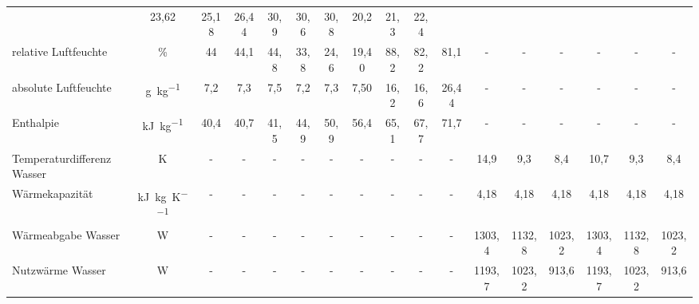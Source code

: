\begin{landscape}
\begin{table}[h!]
{\begin{tabular}{l|c|c|c|c|c|c|c|c|c|c|c|c|c|c|c|c}
					&23,62 & 25,18 & 26,44 
					&\multicolumn{1}{c|}{30,9} & \multicolumn{1}{c|}{30,6} & \multicolumn{1}{c|}{30,8} 
					&\multicolumn{1}{c|}{20,2} & \multicolumn{1}{c|}{21,3} & \multicolumn{1}{c}{22,4} \\
					relative Luftfeuchte & \%    & \multicolumn{1}{c|}{44} & \multicolumn{1}{c|}{44,1} &
					\multicolumn{1}{c|}{44,8} 
					& 33,8  & 24,6  & 19,40 
					& 88,2  & 82,2  & 81,1  & -     & -     & -     & -     & -     & - \\
					absolute Luftfeuchte & \si{\gram \per \kg}  
					& \multicolumn{1}{c|}{7,2} & \multicolumn{1}{c|}{7,3} & \multicolumn{1}{c|}{7,5} 
					& 7,2   & 7,3   & 7,50  
					& 16,2  & 16,6  & 26,44 & -     & -     & -     & -     & -     & - \\
					Enthalpie & \si{\kilo \joule \per \kg} & \multicolumn{1}{c|}{40,4} & \multicolumn{1}{c|}{40,7} & \multicolumn{1}{c|}{41,5} 
					& 44,9  & 50,9  & 56,4  
					& 65,1  & 67,7  & 71,7  & -     & -     & -     & -     & -     & - \\
					\hline
					Temperaturdifferenz  Wasser & K     & -     & -     & -     & \multicolumn{1}{c|}{-} & \multicolumn{1}{c|}{-} & \multicolumn{1}{c|}{-} & \multicolumn{1}{c|}{-} & \multicolumn{1}{c|}{-} & \multicolumn{1}{c|}{-} 
					& \multicolumn{1}{c|}{14,9} & \multicolumn{1}{c|}{9,3} & \multicolumn{1}{c|}{8,4}
					& \multicolumn{1}{c|}{10,7} & 9,3   & 8,4 \\
					Wärmekapazität & \si{\kilo \joule \per \kg \per \kelvin} & -     & -     & -     & \multicolumn{1}{c|}{-} & \multicolumn{1}{c|}{-} & \multicolumn{1}{c|}{-} & \multicolumn{1}{c|}{-} & \multicolumn{1}{c|}{-} & \multicolumn{1}{c|}{-}
					& \multicolumn{1}{c|}{4,18} & \multicolumn{1}{c|}{4,18} & \multicolumn{1}{c|}{4,18} & \multicolumn{1}{c|}{4,18} & 4,18  & 4,18 \\
					Wärmeabgabe Wasser & W     & -     & -     & -     & \multicolumn{1}{c|}{-} & \multicolumn{1}{c|}{-} & \multicolumn{1}{c|}{-} & \multicolumn{1}{c|}{-} & \multicolumn{1}{c|}{-} & \multicolumn{1}{c|}{-} & \multicolumn{1}{c|}{1303,4} & \multicolumn{1}{c|}{1132,8} & \multicolumn{1}{c|}{1023,2} & \multicolumn{1}{c|}{1303,4} & 1132,8 & 1023,2 \\
					Nutzwärme Wasser & W     & -     & -     & -     & \multicolumn{1}{c|}{-} & \multicolumn{1}{c|}{-} & \multicolumn{1}{c|}{-} & \multicolumn{1}{c|}{-} & \multicolumn{1}{c|}{-} & \multicolumn{1}{c|}{-} & \multicolumn{1}{c|}{1193,7} & \multicolumn{1}{c|}{1023,2} & \multicolumn{1}{c|}{913,6} & \multicolumn{1}{c|}{1193,7} & 1023,2 & 913,6 \\

\end{tabular}}
\end{table}
\end{landscape}
